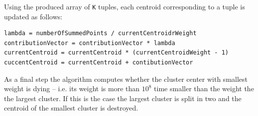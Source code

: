 \documentclass{l4proj}
\begin{document}
Using the produced array of \texttt{K} tuples, each centroid corresponding to a tuple is updated as follows:

\begin{center}
\begin{BVerbatim}
lambda = numberOfSummedPoints / currentCentroidrWeight
contributionVector = contributionVector * lambda
currentCentroid = currentCentroid * (currentCentroidWeight - 1)
cuccentCentroid = currentCentroid + contibutionVector
\end{BVerbatim}
\end{center}

As a final step the algorithm computes whether the cluster center with smallest weight is dying -- i.e. its weight is more than $10^8$ time smaller than the weight the the largest cluster. If this is the case the largest cluster is split in two and the centroid of the smallest cluster is destroyed.
\end{document}
